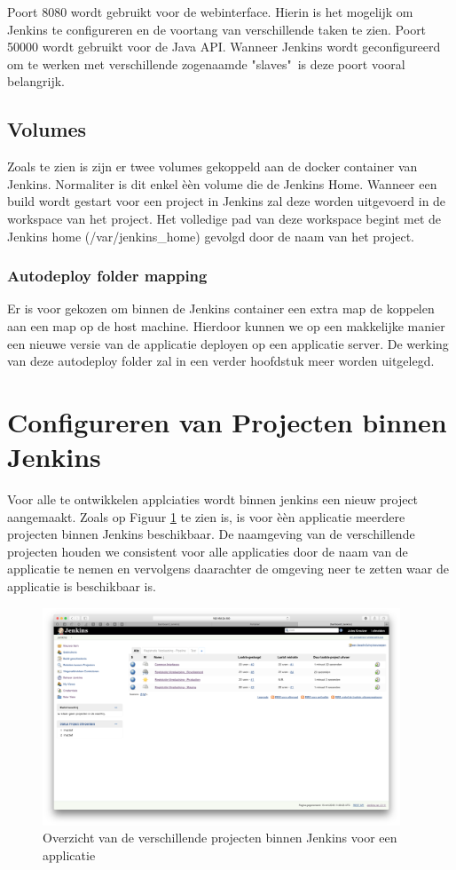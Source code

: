 Poort 8080 wordt gebruikt voor de webinterface. Hierin is het mogelijk om Jenkins te configureren en de voortang van verschillende taken te zien. Poort 50000 wordt gebruikt voor de Java API. Wanneer Jenkins wordt geconfigureerd om te werken met verschillende zogenaamde "slaves"\ is deze poort vooral belangrijk.

\subsection{Volumes}
Zoals te zien is zijn er twee volumes gekoppeld aan de docker container van Jenkins. Normaliter is dit enkel \`e\`en volume die de Jenkins Home. Wanneer een build wordt gestart voor een project in Jenkins zal deze worden uitgevoerd in de workspace van het project. Het volledige pad van deze workspace begint met de Jenkins home (/var/jenkins\_home) gevolgd door de naam van het project.

\subsubsection{Autodeploy folder mapping}
Er is voor gekozen om binnen de Jenkins container een extra map de koppelen aan een map op de host machine. Hierdoor kunnen we op een makkelijke manier een nieuwe versie van de applicatie deployen op een applicatie server. De werking van deze autodeploy folder zal in een verder hoofdstuk meer worden uitgelegd.

\section{Configureren van Projecten binnen Jenkins}
Voor alle te ontwikkelen applciaties wordt binnen jenkins een nieuw project aangemaakt. Zoals op Figuur \ref{fig:JenkinsProjectOverview} te zien is, is voor \`e\`en applicatie meerdere projecten binnen Jenkins beschikbaar. De naamgeving van de verschillende projecten houden we consistent voor alle applicaties door de naam van de applicatie te nemen en vervolgens daarachter de omgeving neer te zetten waar de applicatie is beschikbaar is.

\begin{figure}[H]
	\centering
	\includegraphics[width=0.95\textwidth]{img/JenkinsProjectOverview.png}
	\caption{Overzicht van de verschillende projecten binnen Jenkins voor een applicatie}
	\label{fig:JenkinsProjectOverview}
\end{figure}

